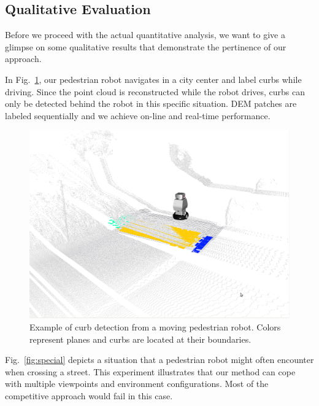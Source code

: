 \subsection{Qualitative Evaluation}
Before we proceed with the actual quantitative analysis, we want to give a
glimpse on some qualitative results that demonstrate the pertinence of our
approach.

In Fig.~\ref{fig:europa}, our pedestrian robot navigates in a city center and
label curbs while driving. Since the point cloud is reconstructed while the
robot drives, curbs can only be detected behind the robot in this specific
situation. DEM patches are labeled sequentially and we achieve on-line and
real-time performance.

\begin{figure}[t]
\centering
\includegraphics[width=\columnwidth]{fig/europa.eps}
\caption{Example of curb detection from a moving pedestrian robot. Colors
represent planes and curbs are located at their boundaries.}
\label{fig:europa}
\end{figure}

Fig.~\ref{fig:special} depicts a situation that a pedestrian robot might often
encounter when crossing a street. This experiment illustrates that our method
can cope with multiple viewpoints and environment configurations. Most of the
competitive approach would fail in this case.

